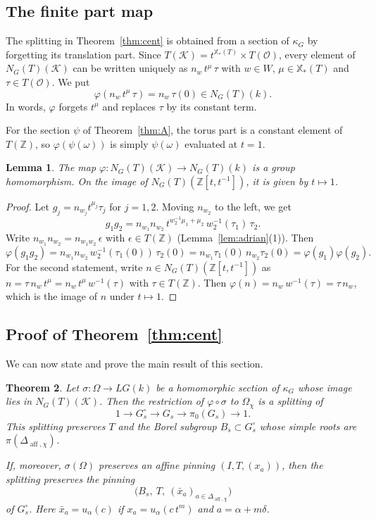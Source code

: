 \documentclass[psamsfonts]{amsart}
\newtheorem{thm}{Theorem}[section]
\newtheorem{lem}[thm]{Lemma}
\theoremstyle{definition}
\theoremstyle{remark}
\numberwithin{equation}{section}
\newcommand{\Z}{\mathbb{Z}}   %
\newcommand{\X}{\mathbb{X}}
\newcommand{\ra}{\rightarrow}
\DeclareMathOperator{\aff}{aff}
\newcommand\cK{\mathcal{K}}
\newcommand\cO{\mathcal{O}}
\numberwithin{equation}{section}
\newcommand{\om}{\omega}
\newcommand{\Om}{\Omega}
\theoremstyle{plain}
\begin{document}
\subsection{The finite part map}
The splitting in Theorem~\ref{thm:cent} is obtained from a section of $\kappa_G$ by forgetting its translation part. Since $T(\cK)=t^{\X_*(T)}\times T(\cO)$, every element of $N_G(T)(\cK)$ can be written uniquely as $n_w\,t^{\mu}\,\tau$ with $w\in W$, $\mu\in\X_*(T)$ and $\tau\in T(\cO)$. We put
\[
\varphi(n_w\,t^{\mu}\,\tau)=n_w\,\tau(0)\in N_G(T)(k).
\]
In words, $\varphi$ forgets $t^\mu$ and replaces $\tau$ by its constant term.

For the section $\psi$ of Theorem~\ref{thm:A}, the torus part is a constant element of $T(\Z)$, so $\varphi(\psi(\om))$ is simply $\psi(\om)$ evaluated at $t=1$.

\begin{lem}\label{lem:finite-part}
The map $\varphi\colon N_G(T)(\cK)\ra N_G(T)(k)$ is a group homomorphism. On the image of $N_G(T)(\Z[t,t^{-1}])$, it is given by $t\mapsto1$.
\end{lem}

\begin{proof}
Let $g_j=n_{w_j}t^{\mu_j}\tau_j$ for $j=1,2$. Moving $n_{w_2}$ to the left, we get
\[
g_1g_2=n_{w_1}n_{w_2}\,t^{w_2^{-1}\mu_1+\mu_2}\,w_2^{-1}(\tau_1)\,\tau_2.
\]
Write $n_{w_1}n_{w_2}=n_{w_1w_2}\,\epsilon$ with $\epsilon\in T(\Z)$ (Lemma~\ref{lem:adrian}(1)). Then
\[
\varphi(g_1g_2)=n_{w_1}n_{w_2}\,w_2^{-1}(\tau_1(0))\,\tau_2(0)=n_{w_1}\tau_1(0)\,n_{w_2}\tau_2(0)=\varphi(g_1)\varphi(g_2).
\]
For the second statement, write $n\in N_G(T)(\Z[t,t^{-1}])$ as $n=\tau\,n_w\,t^{\mu}=n_w\,t^{\mu}\,w^{-1}(\tau)$ with $\tau\in T(\Z)$. Then $\varphi(n)=n_w\,w^{-1}(\tau)=\tau\,n_w$, which is the image of $n$ under $t\mapsto1$.
\end{proof}

\subsection{Proof of Theorem~\ref{thm:cent}}
We can now state and prove the main result of this section.

\begin{thm}\label{thm:cent-body}
Let $\sigma\colon\Om\ra LG(k)$ be a homomorphic section of $\kappa_G$ whose image lies in $N_G(T)(\cK)$. Then the restriction of $\varphi\circ\sigma$ to $\Om_\chi$ is a splitting of
\[
1\ra G_s^{\circ}\ra G_s\ra\pi_0(G_s)\ra1.
\]
This splitting preserves $T$ and the Borel subgroup $B_s\subset G_s^{\circ}$ whose simple roots are $\pi(\Delta_{\aff,\chi})$.

If, moreover, $\sigma(\Om)$ preserves an affine pinning $(I,T,(x_a))$, then the splitting preserves the pinning
\[
\big(B_s,\ T,\ (\bar x_a)_{a\in\Delta_{\aff,\chi}}\big)
\]
of $G_s^{\circ}$. Here $\bar x_a=u_\alpha(c)$ if $x_a=u_\alpha(c\,t^m)$ and $a=\alpha+m\delta$.
\end{thm}
\end{document}
